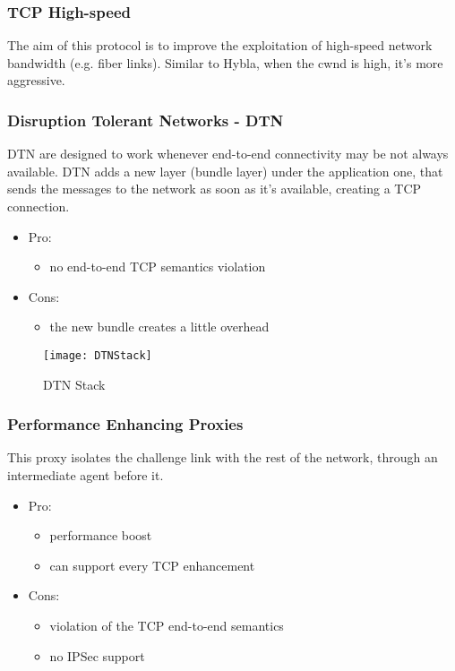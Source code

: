 \subsubsection{TCP High-speed}
The aim of this protocol is to improve the exploitation of high-speed network
bandwidth (e.g. fiber links). Similar to Hybla, when the cwnd is high, it's
more aggressive.

\subsubsection{Disruption Tolerant Networks - DTN}
DTN are designed to work whenever end-to-end connectivity may be not always
available. DTN adds a new layer (bundle layer) under the application one, that
sends the messages to the network as soon as it's available, creating a TCP
connection.
\begin{itemize}
\item Pro:
  \begin{itemize}
  \item no end-to-end TCP semantics violation
  \end{itemize}
\item Cons:
  \begin{itemize}
  \item the new bundle creates a little overhead
  \end{itemize}
\end{itemize}

\begin{figure}[t]
  \centering
  \texttt{[image: DTNStack]}
  \caption{DTN Stack}
\end{figure}

\subsubsection{Performance Enhancing Proxies}
This proxy isolates the challenge link with the rest of the network, through an
intermediate agent before it.
\begin{itemize}
\item Pro:
  \begin{itemize}
  \item performance boost
  \item can support every TCP enhancement
  \end{itemize}
\item Cons:
  \begin{itemize}
  \item violation of the TCP end-to-end semantics
  \item no IPSec support
  \end{itemize}
\end{itemize}

